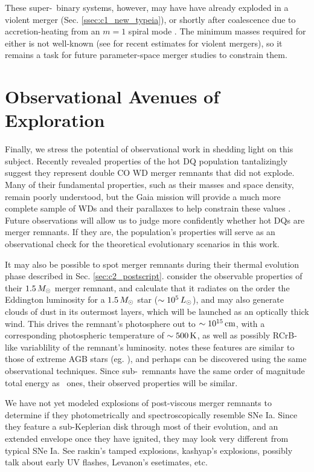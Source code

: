 These super-\Mch\ binary systems, however, may have have already exploded in a violent merger (Sec. \ref{ssec:c1_new_typeia}), or shortly after coalescence due to accretion-heating from an $m = 1$ spiral mode \citep{kash+15}.  The minimum masses required for either is not well-known (see \citealt{dan+12, sato+16} for recent estimates for violent mergers), so it remains a task for future parameter-space merger studies to constrain them.
 
\section{Observational Avenues of Exploration}

Finally, we stress the potential of observational work in shedding light on this subject.  Recently revealed properties of the hot DQ population tantalizingly suggest they represent double CO WD merger remnants that did not explode.  Many of their fundamental properties, such as their masses and space density, remain poorly understood, but the Gaia mission will provide a much more complete sample of WDs and their parallaxes to help constrain these values \citep{dunl15thesis}.  Future observations will allow us to judge more confidently whether hot DQs are merger remnants.  If they are, the population's properties will serve as an observational check for the theoretical evolutionary scenarios in this work.

It may also be possible to spot merger remnants during their thermal evolution phase described in Sec. \ref{sec:c2_postscript}.  \cite{schw+16} consider the observable properties of their $1.5\,\Msun$ merger remnant, and calculate that it radiates on the order the Eddington luminosity for a $1.5\,\Msun$ star ($\sim10^5\,\Lsun$), and may also generate clouds of dust in its outermost layers, which will be launched as an optically thick wind.  This drives the remnant's photosphere out to $\sim10^{15}\,\mathrm{cm}$, with a corresponding photospheric temperature of $\sim500\,\mathrm{K}$, as well as possibly RCrB-like variablility of the remnant's luminosity.  \citep{schw+16} notes these features are similar to those of extreme AGB stars (eg. \citealt{blum+06}), and perhaps can be discovered using the same observational techniques.  Since sub-\Mch\ remnants have the same order of magnitude total energy as \Mch\ ones, their observed properties will be similar.

{\charles We have not yet modeled explosions of post-viscous merger remnants to determine if they photometrically and spectroscopically resemble SNe Ia.  Since they feature a sub-Keplerian disk through most of their evolution, and an extended envelope once they have ignited, they may look very different from typical SNe Ia.  See raskin's tamped explosions, kashyap's explosions, possibly talk about early UV flashes, Levanon's esetimates, etc.}

